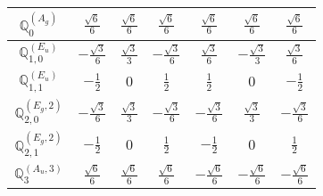 \documentclass[fleqn,10pt,landscape]{article}
\begin{document}
\begin{itemize}
{\begin{center}
\begin{longtable}{ccccccc}
$\mathbb{Q}_{0}^{(A_{g})}$ & $ \frac{\sqrt{6}}{6} $ & $ \frac{\sqrt{6}}{6} $ & $ \frac{\sqrt{6}}{6} $ & $ \frac{\sqrt{6}}{6} $ & $ \frac{\sqrt{6}}{6} $ & $ \frac{\sqrt{6}}{6} $ \\ \hline
$\mathbb{Q}_{1,0}^{(E_{u})}$ & $ - \frac{\sqrt{3}}{6} $ & $ \frac{\sqrt{3}}{3} $ & $ - \frac{\sqrt{3}}{6} $ & $ \frac{\sqrt{3}}{6} $ & $ - \frac{\sqrt{3}}{3} $ & $ \frac{\sqrt{3}}{6} $ \\ \hline
$\mathbb{Q}_{1,1}^{(E_{u})}$ & $ - \frac{1}{2} $ & $ 0 $ & $ \frac{1}{2} $ & $ \frac{1}{2} $ & $ 0 $ & $ - \frac{1}{2} $ \\ \hline
$\mathbb{Q}_{2,0}^{(E_{g},2)}$ & $ - \frac{\sqrt{3}}{6} $ & $ \frac{\sqrt{3}}{3} $ & $ - \frac{\sqrt{3}}{6} $ & $ - \frac{\sqrt{3}}{6} $ & $ \frac{\sqrt{3}}{3} $ & $ - \frac{\sqrt{3}}{6} $ \\ \hline
$\mathbb{Q}_{2,1}^{(E_{g},2)}$ & $ - \frac{1}{2} $ & $ 0 $ & $ \frac{1}{2} $ & $ - \frac{1}{2} $ & $ 0 $ & $ \frac{1}{2} $ \\ \hline
$\mathbb{Q}_{3}^{(A_{u},3)}$ & $ \frac{\sqrt{6}}{6} $ & $ \frac{\sqrt{6}}{6} $ & $ \frac{\sqrt{6}}{6} $ & $ - \frac{\sqrt{6}}{6} $ & $ - \frac{\sqrt{6}}{6} $ & $ - \frac{\sqrt{6}}{6} $ \\
\end{longtable}
\end{center}
}
\end{itemize}
\end{document}
